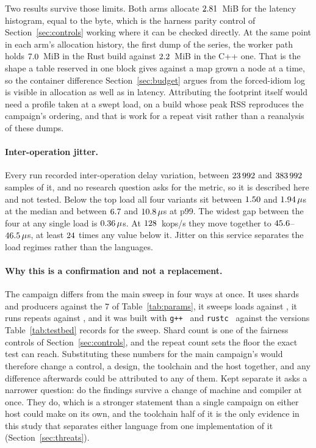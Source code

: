 \documentclass[english,oneside,a4paper,censored,csm,software-track-2020]{HYthesisML}
\begin{document}
Two results survive those limits. Both arms allocate $2.81$~MiB for the latency histogram,
equal to the byte, which is the harness parity control of Section~\ref{sec:controls} working where
it can be checked directly. At the same point in each arm's allocation history, the first dump of
the series, the worker path holds $7.0$~MiB in the Rust build against
$2.2$~MiB in the C++ one. That is the shape a table reserved in one block gives against
a map grown a node at a time, so the container difference Section~\ref{sec:budget} argues from the
forced-idiom log is visible in allocation as well as in latency. Attributing the footprint itself
would need a profile taken at a swept load, on a build whose peak RSS reproduces the campaign's
ordering, and that is work for a repeat visit rather than a reanalysis of these dumps.

\paragraph{Inter-operation jitter.}
Every run recorded inter-operation delay variation, between $23\,992$ and
$383\,992$ samples of it, and no research question asks for the metric, so it is
described here and not tested. Below the top load all four variants sit between
$1.50$ and $1.94\,\mu$s at the median and between
$6.7$ and $10.8\,\mu$s at p99. The widest gap between the four at
any single load is $0.36\,\mu$s. At $128$~kops/s they move together to
$45.6$--$46.5\,\mu$s, at least $24$ times any value below it.
Jitter on this service separates the load regimes rather than the languages.

\paragraph{Why this is a confirmation and not a replacement.}
The campaign differs from the main sweep in four ways at once. It uses \BmShards{} shards and
\BmProducers{} producers against the $7$ of Table~\ref{tab:params}, it sweeps \BmLoadLevels{}
loads against \NLoadLevels{}, it runs \BmRepeats{} repeats against
\NRepeats{}, and it was built with \texttt{g++~\BmGpp} and \texttt{rustc~\BmRustc} against the
versions Table~\ref{tab:testbed} records for the sweep. Shard count is one of the fairness controls
of Section~\ref{sec:controls}, and the repeat count sets the floor the exact test can reach.
Substituting these numbers for the main
campaign's would therefore change a control, a design, the toolchain and the host together, and any
difference afterwards could be attributed to any of them. Kept separate it asks a narrower question:
do the findings survive a change of machine and compiler at once. They do, which is a stronger
statement than a single campaign on either host could make on its own, and the toolchain half of it
is the only evidence in this study that separates either language from one implementation of it
(Section~\ref{sec:threats}).
\end{document}
